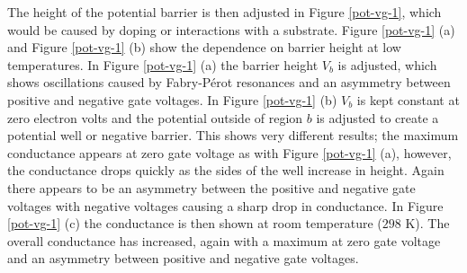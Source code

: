 \documentclass[12pt,a4paper]{report}
\begin{document}
	The height of the potential barrier is then adjusted in Figure \ref{pot-vg-1}, which would be caused by doping or interactions with a substrate. Figure \ref{pot-vg-1} (a) and Figure \ref{pot-vg-1} (b) show the dependence on barrier height at low temperatures. In Figure \ref{pot-vg-1} (a) the barrier height $V_{b}$ is adjusted, which shows oscillations caused by Fabry-P\'{e}rot resonances and an asymmetry between positive and negative gate voltages. In Figure \ref{pot-vg-1} (b) $V_{b}$ is kept constant at zero electron volts and the potential outside of region $b$ is adjusted to create a potential well or negative barrier. This shows very different results; the maximum conductance appears at zero gate voltage as with Figure \ref{pot-vg-1} (a), however, the conductance drops quickly as the sides of the well increase in height. Again there appears to be an asymmetry between the positive and negative gate voltages with negative voltages causing a sharp drop in conductance. In Figure \ref{pot-vg-1} (c) the conductance is then shown at room temperature ($298$ K). The overall conductance has increased, again with a maximum at zero gate voltage and an asymmetry between positive and negative gate voltages.
\end{document}
